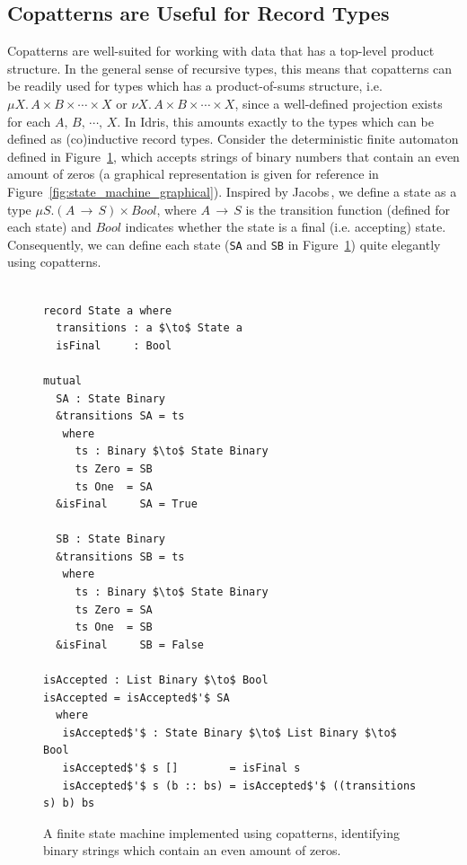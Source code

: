 \subsection{Copatterns are Useful for Record Types}
\label{sec:prod-vs.-copr}
Copatterns are well-suited for working with data that has a top-level product
structure. In the general sense of recursive types, this means that copatterns
can be readily used for types which has a product-of-sums structure, i.e.
${\mu X.\,A\times B\times\cdots\times X}$ or
${\nu X.\,A\times B\times\cdots\times X}$, since a well-defined projection
exists for each $A,\,B,\,\cdots,\,X$. In Idris, this amounts exactly to the types
which can be defined as (co)inductive record types. Consider the deterministic
finite automaton defined in Figure~\ref{fig:state_machine}, which accepts
strings of binary numbers that contain an even amount of zeros (a graphical
representation is given for reference in
Figure~\ref{fig:state_machine_graphical}). Inspired by
Jacobs\,\citep{JacobsCoalgebra}, we define a state as a type ${\mu
S. (A\,\to\,S)\times Bool}$, where $A\,\to\,S$ is the transition function
(defined for each state) and $Bool$ indicates whether the state is a final
(i.e. accepting) state. Consequently, we can define each state (\texttt{SA} and
\texttt{SB} in Figure~\ref{fig:state_machine}) quite elegantly using copatterns.

\begin{figure}[h]
\begin{lstlisting}[mathescape]

record State a where
  transitions : a $\to$ State a 
  isFinal     : Bool

mutual  
  SA : State Binary
  &transitions SA = ts
   where
     ts : Binary $\to$ State Binary
     ts Zero = SB
     ts One  = SA
  &isFinal     SA = True 
  
  SB : State Binary
  &transitions SB = ts
   where
     ts : Binary $\to$ State Binary
     ts Zero = SA 
     ts One  = SB
  &isFinal     SB = False

isAccepted : List Binary $\to$ Bool
isAccepted = isAccepted$'$ SA
  where
   isAccepted$'$ : State Binary $\to$ List Binary $\to$ Bool
   isAccepted$'$ s []        = isFinal s
   isAccepted$'$ s (b :: bs) = isAccepted$'$ ((transitions s) b) bs
\end{lstlisting}
  \caption{A finite state machine implemented using copatterns, identifying
    binary strings which contain an even amount of zeros.}
\label{fig:state_machine}
\end{figure}

